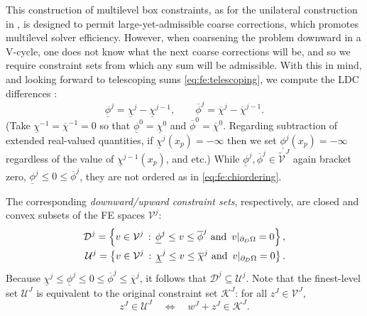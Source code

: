 \documentclass[review,hidelinks,onefignum,onetabnum]{siamart220329}
\begin{document}
This construction of multilevel box constraints, as for the unilateral construction in \cite{GraeserKornhuber2009}, is designed to permit large-yet-admissible coarse corrections, which promotes multilevel solver efficiency.  However, when coarsening the problem downward in a V-cycle, one does not know what the next coarse corrections will be, and so we require constraint sets from which any sum will be admissible.  With this in mind, and looking forward to telescoping sums \eqref{eq:fe:telescoping}, we compute the LDC differences \cite{GraeserKornhuber2009}:
\begin{equation}
\underline{\phi}^j = \underline{\chi}^j - \underline{\chi}^{j-1}, \qquad \overline{\phi}^j = \overline{\chi}^j - \overline{\chi}^{j-1}.  \label{eq:fe:philevels}
\end{equation}
(Take $\underline{\chi}^{-1}=\overline{\chi}^{-1}=0$ so that $\underline{\phi}^0=\underline{\chi}^0$ and $\overline{\phi}^0=\overline{\chi}^0$.  Regarding subtraction of extended real-valued quantities, if $\underline{\chi}^j(x_p)=-\infty$ then we set $\underline{\phi}^j(x_p)=-\infty$ regardless of the value of $\underline{\chi}^{j-1}(x_p)$, and etc.)  While $\underline{\phi}^{j},\overline{\phi}^{j} \in \tilde{\mathcal{V}}^J$ again bracket zero, $\underline{\phi}^j \le 0 \le \overline{\phi}^j$, they are not ordered as in \eqref{eq:fe:chiordering}.

The corresponding \emph{downward/upward constraint sets}, respectively, are closed and convex subsets of the FE spaces $\mathcal{V}^j$:
\begin{align}
\mathcal{D}^j = \left\{v \in \mathcal{V}^j \,:\, \underline{\phi}^j \le v \le \overline{\phi}^j \text{ and } \, v|_{\partial_D\Omega} = 0\right\}, \label{eq:fe:constraintsets} \\
\mathcal{U}^j = \left\{v \in \mathcal{V}^j \,:\, \underline{\chi}^j \le v \le \overline{\chi}^j \text{ and } \, v|_{\partial_D\Omega} = 0\right\}. \notag
\end{align}
Because $\underline{\chi}^j \le \underline{\phi}^j \le 0 \le \overline{\phi}^j \le \overline{\chi}^j$, it follows that $\mathcal{D}^j \subseteq \mathcal{U}^j$.  Note that the finest-level set $\mathcal{U}^J$ is equivalent to the original constraint set $\mathcal{K}^J$: for all $z^J \in \mathcal{V}^J$,
\begin{equation}
z^J \in \mathcal{U}^J \quad \iff \quad w^J+z^J \in \mathcal{K}^J. \label{eq:fe:finestlevelequivalent}
\end{equation}
\end{document}
